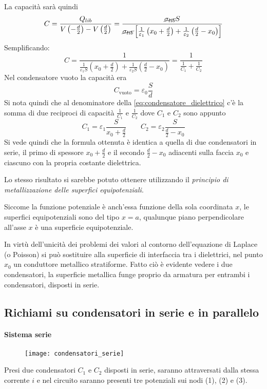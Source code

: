 La capacità sarà quindi 
$$
C = \frac{Q_{lib}}{V\left(-\frac{d}{2}\right) - V\left(\frac{d}{2}\right)} = 
\frac{\cancel{\sigma_{lib}}S}{\cancel{\sigma_{lib}} \left[ \frac{1}{\varepsilon_1}\left(x_0+\frac{d}{2}\right) + \frac{1}{\varepsilon_2}\left(\frac{d}{2}-x_0\right) \right] }
$$
Semplificando:
\begin{equation}
C = \frac{1}{ \frac{1}{\varepsilon_1S} \left(x_0 + \frac{d}{2} \right) + \frac{1}{\varepsilon_2S} \left( \frac{d}{2} - x_0 \right) } = \frac{1}{\frac{1}{C_1}+\frac{1}{C_2}}
\label{eq:condensatore_dielettrico}
\end{equation}
Nel condensatore vuoto la capacità era
$$
C_{\text{vuoto}} = \varepsilon_0\frac{S}{d}
$$
Si nota quindi che al denominatore della \ref{eq:condensatore_dielettrico} c'è la somma di due
reciproci di capacità $\frac{1}{C_1}$ e $\frac{1}{C_2}$ dove $C_1$ e $C_2$ sono appunto
$$
C_1 = \varepsilon_1 \frac{S}{x_0 + \frac{d}{2}} \qquad C_2 = \varepsilon_2 \frac{S}{\frac{d}{2}-x_0}
$$
Si vede quindi che la formula ottenuta è identica a quella di due condensatori in serie,
il primo di spessore $x_0 + \frac{d}{2}$ e il secondo $\frac{d}{2}-x_0$ adiacenti sulla faccia
$x_0$ e ciascuno con la propria costante dielettrica.

Lo stesso risultato si sarebbe potuto ottenere utilizzando il \textit{principio di metallizzazione delle 
superfici equipotenziali}.

Siccome la funzione potenziale è anch'essa funzione della sola coordinata $x$,  le superfici 
equipotenziali sono del tipo $x=a$, qualunque piano perpendicolare all'asse $x$ è una superficie
equipotenziale.

In virtù dell'unicità dei problemi dei valori al contorno dell'equazione di Laplace (o Poisson)
si può sostituire alla superficie di interfaccia tra i dielettrici, nel punto $x_0$ un conduttore
metallico stratiforme.
Fatto ciò è evidente vedere i due condensatori, la superficie metallica funge proprio
da armatura per entrambi i condensatori, disposti in serie.
\newpage
\subsection{Richiami su condensatori in serie e in parallelo}
\paragraph{Sistema serie}
\begin{figure}[H]
\centering
\texttt{[image: condensatori\_serie]}
\end{figure}
Presi due condensatori $C_1$ e $C_2$ disposti in serie, saranno attraversati dalla stessa corrente
$i$ e nel circuito saranno presenti tre potenziali sui nodi (1), (2) e (3).

